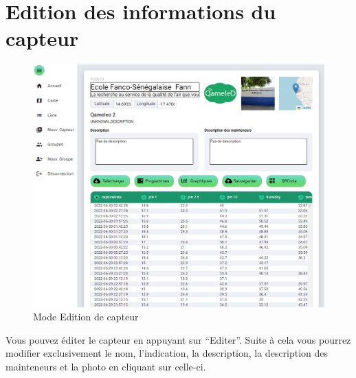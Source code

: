 \section{Edition des informations du capteur}\label{sec:edition des informations du capteur}


    \begin{figure}[H]
        \begin{center}
            \includegraphics[width=12cm]{resources/edit}
        \end{center}
        \caption{Mode Edition de capteur}\label{fig:edition}
    \end{figure}

    Vous pouvez éditer le capteur en appuyant sur ``Editer''.
    Suite à cela vous pourrez modifier exclusivement le nom, l'indication, la description,
    la description des mainteneurs et la photo en cliquant sur celle-ci.